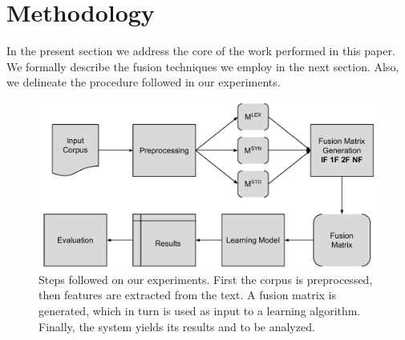 \documentclass{llncs}
\begin{document}


\section{Methodology}
In the present section we address the core of the work performed in this paper.
We formally describe the fusion techniques we employ in the next section. Also, we  delineate the procedure followed in our experiments. 





\begin{figure}[t]
\centering
\caption{Steps followed on our experiments. First the corpus is preprocessed, then features are extracted from the text. A fusion matrix is generated, which in turn is used as input to a learning algorithm. Finally, the system yields its results and to be analyzed.}
\includegraphics[width=0.85\linewidth]{img/diag_metodo}

\label{fig:diagmetodo}
\end{figure}
\end{document}
